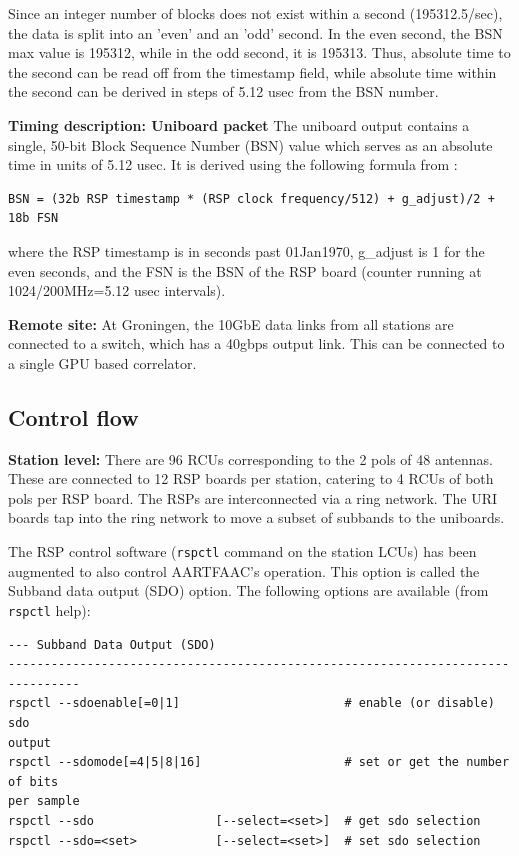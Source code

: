\documentclass {article}
\begin{document}
Since an integer number of blocks does not exist within a second (195312.5/sec),
the data is  split into an 'even' and  an 'odd' second. In the  even second, the
BSN max  value is 195312, while  in the odd  second, it is 195313. Thus, absolute time to the second can be read off from the timestamp field, while absolute time within the second can be derived in steps of 5.12 usec from the BSN number.

\textbf  {Timing description: Uniboard  packet} The  uniboard output  contains a
single, 50-bit  Block Sequence  Number (BSN) value  which serves as  an absolute
time in units of 5.12 usec. It is derived using the following formula from \cite{RP-1402}:
\begin{lstlisting}
BSN = (32b RSP timestamp * (RSP clock frequency/512) + g_adjust)/2 + 18b FSN
\end{lstlisting}
where the RSP timestamp is in seconds past 01Jan1970, g\_adjust is 1 for the even
seconds,  and  the  FSN  is  the  BSN  of the  RSP  board  (counter  running  at
1024/200MHz=5.12 usec intervals).


\textbf{Remote site:} At  Groningen, the 10GbE data links  from all stations are
connected to a switch, which has a  40gbps output link. This can be connected to
a single GPU based correlator.

\subsection {Control flow}
\textbf {Station  level:} There are  96 RCUs corresponding  to the 2 pols  of 48
antennas. These are  connected to 12 RSP boards per station,  catering to 4 RCUs
of both pols per RSP board.  The RSPs are interconnected via a ring network. The
URI  boards tap  into the  ring network  to  move a  subset of  subbands to  the
uniboards.

The RSP control software (\verb+rspctl+ command  on the station LCUs) has been
augmented  to also  control AARTFAAC's  operation. This  option is  called the
Subband data output  (SDO) option.  The following options  are available (from
\verb+rspctl+ help):
\begin{verbatim}
--- Subband Data Output (SDO)
--------------------------------------------------------------------------------
rspctl --sdoenable[=0|1]                       # enable (or disable) sdo
output
rspctl --sdomode[=4|5|8|16]                    # set or get the number of bits
per sample
rspctl --sdo                 [--select=<set>]  # get sdo selection
rspctl --sdo=<set>           [--select=<set>]  # set sdo selection
\end{verbatim}
\end{document}
